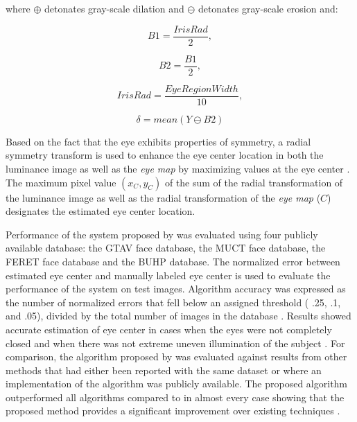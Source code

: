  where $\oplus$ detonates gray-scale dilation and $\ominus$ detonates gray-scale erosion and:

\begin{equation}
\label{eqn_B1}
B1 = \frac{IrisRad}{2},
\end{equation}

\begin{equation}
\label{eqn_B2}
B2 = \frac{B1}{2},
\end{equation}

\begin{equation}
\label{eqn_IrisRad}
IrisRad = \frac{EyeRegionWidth}{10},
\end{equation}

\begin{equation}
\label{eqn_delta}
\delta = mean(Y \ominus B2 )
\end{equation}

\cite{skodras2015precise}

Based on the fact that the eye exhibits properties of symmetry, a radial symmetry transform is used to enhance the eye center location in both the luminance image as well as the \textsl{eye map}  by maximizing values at the eye center  \cite{skodras2015precise}. The maximum pixel value $(x_C,y_C)$ of the sum of the radial transformation of the luminance image as well as the radial transformation of the \textsl{eye map} ($C$) designates the estimated eye center location.

Performance of the system proposed by \cite{skodras2015precise} was evaluated using four publicly available database: the GTAV face database, the MUCT face database, the FERET face database and the BUHP database. The normalized error between estimated eye center and manually labeled eye center is used to evaluate the performance of the system on test images. Algorithm accuracy was expressed as the number of normalized errors that fell below an assigned threshold ( .25, .1, and .05), divided by the total number of images in the database \cite{skodras2015precise}. Results showed accurate estimation of eye center in cases when the eyes were not completely closed and when there was not extreme uneven illumination of the subject \cite{skodras2015precise}. For comparison, the algorithm proposed by \cite{skodras2015precise} was evaluated against results from other methods that had either been reported with the same dataset or where an implementation of the algorithm was publicly available. The proposed algorithm outperformed all algorithms compared to in almost every case showing that the proposed method provides a significant improvement over existing techniques \cite{skodras2015precise}.

